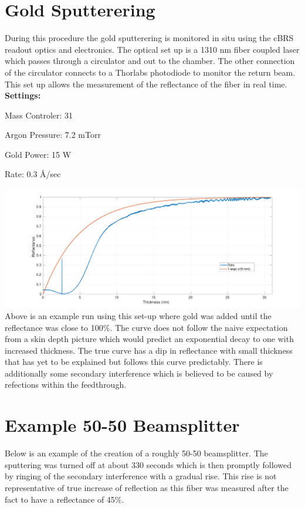 \documentclass{article}
\begin{document}
\section{Gold Sputterering}
During this procedure the gold sputterering is monitored in situ using the cBRS readout optics and electronics. The optical set up is a 1310 nm fiber coupled laser which passes through a circulator and out to the chamber. The other connection of the circulator connects to a Thorlabs photodiode to monitor the return beam. This set up allows the measurement of the reflectance of the fiber in real time.\\

\textbf{Settings:}

Mass Controler: 31

Argon Pressure: 7.2 mTorr

Gold Power: 15 W

Rate: 0.3 \AA/sec

\includegraphics[width=\textwidth]{Gold_Coating_Fiber.pdf}
Above is an example run using this set-up where gold was added until the reflectance was close to 100\%. The curve does not follow the naive expectation from a skin depth picture which would predict an exponential decay to one with increased thickness. The true curve has a dip in reflectance with small thickness that has yet to be explained but follows this curve predictably. There is additionally some secondary interference which is believed to be caused by refections within the feedthrough.

\section{Example 50-50 Beamsplitter}
Below is an example of the creation of a roughly 50-50 beamsplitter. The sputtering was turned off at about 330 seconds which is then promptly followed by ringing of the secondary interference with a gradual rise. This rise is not representative of true increase of reflection as this fiber was measured after the fact to have a reflectance of 45\%.\\
\end{document}
